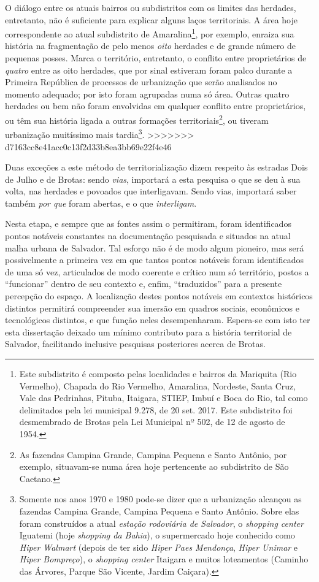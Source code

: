 O diálogo entre os atuais bairros ou subdistritos com os limites das herdades, entretanto, não é suficiente para explicar alguns laços territoriais. A área hoje correspondente ao atual subdistrito de Amaralina\footnote{Este subdistrito é composto pelas localidades e bairros da Mariquita (Rio Vermelho), Chapada do Rio Vermelho, Amaralina, Nordeste, Santa Cruz, Vale das Pedrinhas, Pituba, Itaigara, STIEP, Imbuí e Boca do Rio, tal como delimitados pela lei municipal 9.278, de 20 set. 2017. Este subdistrito foi desmembrado de Brotas pela Lei Municipal nº 502, de 12 de agosto de 1954.}, por exemplo, enraiza sua história na fragmentação de pelo menos \textit{oito} herdades e de grande número de pequenas posses. Marca o território, entretanto, o conflito entre proprietários de \textit{quatro} entre as oito herdades, que por sinal estiveram foram palco durante a Primeira República de processos de urbanização que serão analisados no momento adequado; por isto foram agrupadas numa só área. Outras quatro herdades ou bem não foram envolvidas em qualquer conflito entre proprietários, ou têm sua história ligada a outras formações territoriais\footnote{As fazendas Campina Grande, Campina Pequena e Santo Antônio, por exemplo, situavam-se numa área hoje pertencente ao subdistrito de São Caetano.}, ou tiveram urbanização muitíssimo mais tardia\footnote{Somente nos anos 1970 e 1980 pode-se dizer que a urbanização alcançou as fazendas Campina Grande, Campina Pequena e Santo Antônio. Sobre elas foram construídos a atual \textit{estação rodoviária de Salvador}, o \textit{shopping center} Iguatemi (hoje \textit{shopping da Bahia}), o supermercado hoje conhecido como \textit{Hiper Walmart} (depois de ter sido \textit{Hiper Paes Mendonça}, \textit{Hiper Unimar} e \textit{Hiper Bompreço}), o \textit{shopping center} Itaigara e muitos loteamentos (Caminho das Árvores, Parque São Vicente, Jardim Caiçara).}.
>>>>>>> d7163cc8e41acc0c13f2d33b8ea3bb69e22f4e46

Duas exceções a este método de territorialização dizem respeito às estradas Dois de Julho e de Brotas: sendo \textit{vias}, importará a esta pesquisa o que se deu à sua volta, nas herdades e povoados que interligavam. Sendo vias, importará saber também \textit{por que} foram abertas, e o que \textit{interligam}.

Nesta etapa, e sempre que as fontes assim o permitiram, foram identificados pontos notáveis constantes na documentação pesquisada e situados na atual malha urbana de Salvador. Tal esforço não é de modo algum pioneiro, mas será possivelmente a primeira vez em que tantos pontos notáveis foram identificados de uma só vez, articulados de modo coerente e crítico num só território, postos a ``funcionar'' dentro de seu contexto e, enfim, ``traduzidos'' para a presente percepção do espaço. A localização destes pontos notáveis em contextos históricos distintos permitirá compreender sua imersão em quadros sociais, econômicos e tecnológicos distintos, e que função neles desempenharam. Espera-se com isto ter esta dissertação deixado um mínimo contributo para a história territorial de Salvador, facilitando inclusive pesquisas posteriores acerca de Brotas. 

